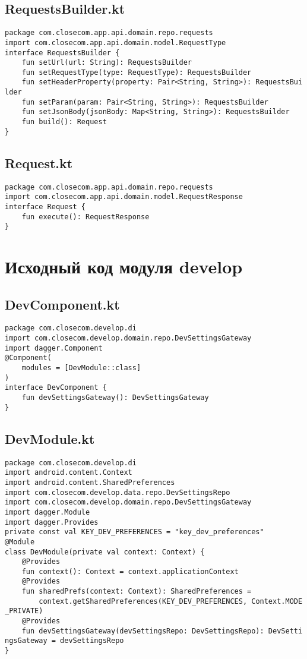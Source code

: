 \documentclass[listing]{espd}
\begin{document}
\subsection{RequestsBuilder.kt}
\begin{verbatim}
package com.closecom.app.api.domain.repo.requests
import com.closecom.app.api.domain.model.RequestType
interface RequestsBuilder {
    fun setUrl(url: String): RequestsBuilder
    fun setRequestType(type: RequestType): RequestsBuilder
    fun setHeaderProperty(property: Pair<String, String>): RequestsBui
lder
    fun setParam(param: Pair<String, String>): RequestsBuilder
    fun setJsonBody(jsonBody: Map<String, String>): RequestsBuilder
    fun build(): Request
}
\end{verbatim}

\subsection{Request.kt}
\begin{verbatim}
package com.closecom.app.api.domain.repo.requests
import com.closecom.app.api.domain.model.RequestResponse
interface Request {
    fun execute(): RequestResponse
}
\end{verbatim}

\section{Исходный код модуля develop}

\subsection{DevComponent.kt}
\begin{verbatim}
package com.closecom.develop.di
import com.closecom.develop.domain.repo.DevSettingsGateway
import dagger.Component
@Component(
    modules = [DevModule::class]
)
interface DevComponent {
    fun devSettingsGateway(): DevSettingsGateway
}
\end{verbatim}

\subsection{DevModule.kt}
\begin{verbatim}
package com.closecom.develop.di
import android.content.Context
import android.content.SharedPreferences
import com.closecom.develop.data.repo.DevSettingsRepo
import com.closecom.develop.domain.repo.DevSettingsGateway
import dagger.Module
import dagger.Provides
private const val KEY_DEV_PREFERENCES = "key_dev_preferences"
@Module
class DevModule(private val context: Context) {
    @Provides
    fun context(): Context = context.applicationContext
    @Provides
    fun sharedPrefs(context: Context): SharedPreferences =
        context.getSharedPreferences(KEY_DEV_PREFERENCES, Context.MODE
_PRIVATE)
    @Provides
    fun devSettingsGateway(devSettingsRepo: DevSettingsRepo): DevSetti
ngsGateway = devSettingsRepo
}
\end{verbatim}
\end{document}
